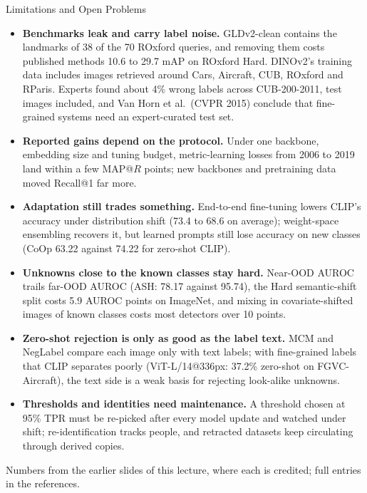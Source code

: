 \begin{frame}{Limitations and Open Problems}
  \begin{itemize}\scriptsize\itemsep0.2em
    \item \textbf{Benchmarks leak and carry label noise.} GLDv2-clean contains the landmarks of 38 of the 70 ROxford queries, and removing them costs published methods 10.6 to 29.7 mAP on ROxford Hard. DINOv2's training data includes images retrieved around Cars, Aircraft, CUB, ROxford and RParis. Experts found about 4\% wrong labels across CUB-200-2011, test images included, and Van Horn et al.\ (CVPR 2015) conclude that fine-grained systems need an expert-curated test set.
    \item \textbf{Reported gains depend on the protocol.} Under one backbone, embedding size and tuning budget, metric-learning losses from 2006 to 2019 land within a few MAP@$R$ points; new backbones and pretraining data moved Recall@1 far more.
    \item \textbf{Adaptation still trades something.} End-to-end fine-tuning lowers CLIP's accuracy under distribution shift (73.4 to 68.6 on average); weight-space ensembling recovers it, but learned prompts still lose accuracy on new classes (CoOp 63.22 against 74.22 for zero-shot CLIP).
    \item \textbf{Unknowns close to the known classes stay hard.} Near-OOD AUROC trails far-OOD AUROC (ASH: 78.17 against 95.74), the Hard semantic-shift split costs 5.9 AUROC points on ImageNet, and mixing in covariate-shifted images of known classes costs most detectors over 10 points.
    \item \textbf{Zero-shot rejection is only as good as the label text.} MCM and NegLabel compare each image only with text labels; with fine-grained labels that CLIP separates poorly (ViT-L/14@336px: 37.2\% zero-shot on FGVC-Aircraft), the text side is a weak basis for rejecting look-alike unknowns.
    \item \textbf{Thresholds and identities need maintenance.} A threshold chosen at 95\% TPR must be re-picked after every model update and watched under shift; re-identification tracks people, and retracted datasets keep circulating through derived copies.
  \end{itemize}
  \vspace{0.1em}
  {\scriptsize Numbers from the earlier slides of this lecture, where each is credited; full entries in the references.\par}
\end{frame}

